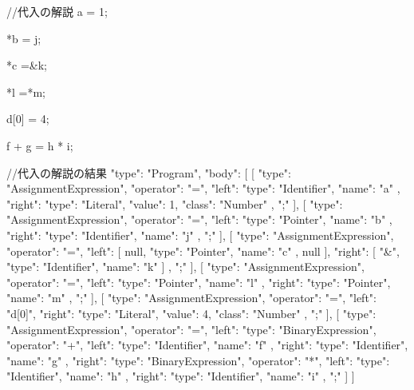 //代入の解説
a = 1;

*b = j;

*c =&k;

*l =*m;

d[0] = 4;

f + g = h * i;

//代入の解説の結果
{
   "type": "Program",
   "body": [
      [
         {
            "type": "AssignmentExpression",
            "operator": "=",
            "left": {
               "type": "Identifier",
               "name": "a"
            },
            "right": {
               "type": "Literal",
               "value": 1,
               "class": "Number"
            }
         },
         ";"
      ],
      [
         {
            "type": "AssignmentExpression",
            "operator": "=",
            "left": {
               "type": "Pointer",
               "name": "b"
            },
            "right": {
               "type": "Identifier",
               "name": "j"
            }
         },
         ";"
      ],
      [
         {
            "type": "AssignmentExpression",
            "operator": "=",
            "left": [
               null,
               {
                  "type": "Pointer",
                  "name": "c"
               },
               null
            ],
            "right": [
               "&",
               {
                  "type": "Identifier",
                  "name": "k"
               }
            ]
         },
         ";"
      ],
      [
         {
            "type": "AssignmentExpression",
            "operator": "=",
            "left": {
               "type": "Pointer",
               "name": "l"
            },
            "right": {
               "type": "Pointer",
               "name": "m"
            }
         },
         ";"
      ],
      [
         {
            "type": "AssignmentExpression",
            "operator": "=",
            "left": "d[0]",
            "right": {
               "type": "Literal",
               "value": 4,
               "class": "Number"
            }
         },
         ";"
      ],
      [
         {
            "type": "AssignmentExpression",
            "operator": "=",
            "left": {
               "type": "BinaryExpression",
               "operator": "+",
               "left": {
                  "type": "Identifier",
                  "name": "f"
               },
               "right": {
                  "type": "Identifier",
                  "name": "g"
               }
            },
            "right": {
               "type": "BinaryExpression",
               "operator": "*",
               "left": {
                  "type": "Identifier",
                  "name": "h"
               },
               "right": {
                  "type": "Identifier",
                  "name": "i"
               }
            }
         },
         ";"
      ]
   ]
}

